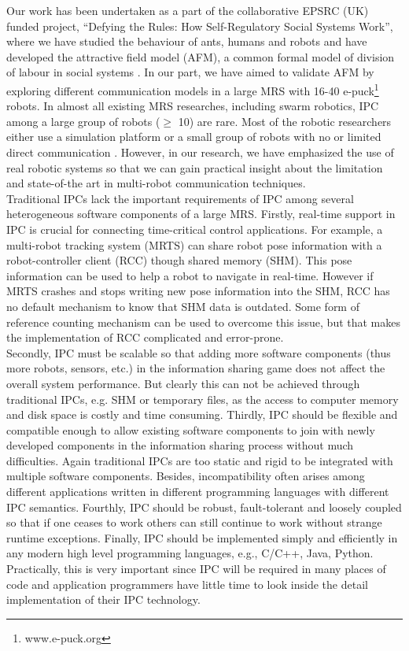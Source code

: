 \documentclass{ifacconf}
\begin{document}
Our work has been undertaken as a part of the collaborative EPSRC (UK) funded project, ``Defying the Rules: How Self-Regulatory Social Systems Work'', where we have studied the behaviour of ants, humans and robots and have developed the attractive field model (AFM), a common formal model of division of labour in social systems \citep{Arcaute+2008}. In our part, we have aimed to validate AFM by exploring different communication models in a large MRS with 16-40 e-puck\footnote{www.e-puck.org} robots. In almost all existing MRS researches, including swarm robotics, IPC among a large group of robots ($\geq$ 10) are rare. Most of the robotic researchers either use a simulation platform or a small group of robots with no or limited direct communication \citep[e.g. ][]{Labella2007}.   However, in our research, we have emphasized the use of real robotic systems so that we can gain practical insight about the limitation and state-of-the art in multi-robot communication techniques.\\
Traditional IPCs lack the important requirements of IPC among several heterogeneous software components of a large MRS. Firstly, real-time support in IPC is crucial for connecting time-critical control applications. For example, a multi-robot tracking system (MRTS) can share robot pose information with a robot-controller client (RCC) though shared memory (SHM). This pose information can be used to help  a robot to navigate in real-time. However if MRTS crashes and stops writing new pose information into the SHM, RCC has no default mechanism to know that SHM data is outdated. Some form of reference counting mechanism can be used to overcome this issue, but that makes the implementation of RCC complicated and error-prone.\\
Secondly, IPC must be scalable so that adding more software components (thus more robots, sensors, etc.) in the information sharing game does not affect the overall system performance. But clearly this can not be achieved through traditional IPCs, e.g. SHM or temporary files,  as the access to computer memory and disk space is costly and time consuming. Thirdly, IPC should be flexible and compatible enough to allow existing software components to join with newly developed components in the information  sharing process without much difficulties. Again traditional IPCs are too static and rigid to be integrated with multiple software components. Besides, incompatibility often arises among different applications written in different programming languages with different  IPC semantics. Fourthly, IPC should be robust, fault-tolerant and loosely coupled so that if one ceases to work others can still continue to work without strange runtime exceptions. Finally, IPC should be implemented simply and efficiently in any modern high level programming languages, e.g., C/C++, Java, Python. Practically, this is very important since IPC will be required in many places of code and application programmers have little time to look inside the detail implementation of their IPC technology.\\
\end{document}
